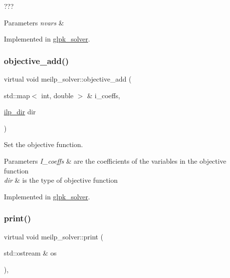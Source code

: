 ??? 


\begin{DoxyParams}{Parameters}
{\em nvars} & \\
\hline
\end{DoxyParams}


Implemented in \hyperlink{classglpk__solver_a1b0f80ab919e5b0b702f050e52835c9a}{glpk\+\_\+solver}.

\mbox{\label{classmeilp__solver_a6478c7167ffb9c270104ba07cc102c58}} 
\subsubsection{\texorpdfstring{objective\+\_\+add()}{objective\_add()}}
{\footnotesize\ttfamily virtual void meilp\+\_\+solver\+::objective\+\_\+add (\begin{DoxyParamCaption}\item[{std\+::map$<$ int, double $>$ \&}]{i\+\_\+coeffs,  }\item[{\hyperlink{classmeilp__solver_a2f719db6577d73007d942af7e6fe907c}{ilp\+\_\+dir}}]{dir }\end{DoxyParamCaption})\hspace{0.3cm}{\ttfamily [pure virtual]}}



Set the objective function. 


\begin{DoxyParams}{Parameters}
{\em I\+\_\+coeffs} & are the coefficients of the variables in the objective function \\
\hline
{\em dir} & is the type of objective function \\
\hline
\end{DoxyParams}


Implemented in \hyperlink{classglpk__solver_ac1a448337e6c26eae851c455091d699a}{glpk\+\_\+solver}.

\mbox{\label{classmeilp__solver_ae7889c65c08ee542bba4913b853e0714}} 
\subsubsection{\texorpdfstring{print()}{print()}}
{\footnotesize\ttfamily virtual void meilp\+\_\+solver\+::print (\begin{DoxyParamCaption}\item[{std\+::ostream \&}]{os }\end{DoxyParamCaption})\hspace{0.3cm}{\ttfamily [protected]}, {}}



